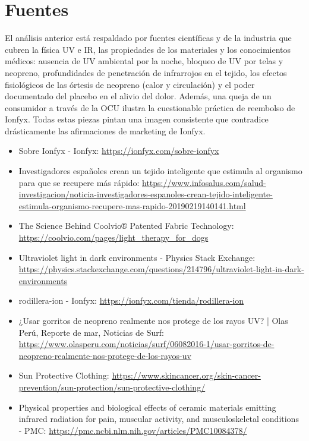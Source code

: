 \documentclass{article}
\begin{document}
\section*{Fuentes}
El análisis anterior está respaldado por fuentes científicas y de la industria que cubren la física UV e IR, las propiedades de los materiales y los conocimientos médicos: ausencia de UV ambiental por la noche, bloqueo de UV por telas y neopreno, profundidades de penetración de infrarrojos en el tejido, los efectos fisiológicos de las órtesis de neopreno (calor y circulación) y el poder documentado del placebo en el alivio del dolor. Además, una queja de un consumidor a través de la OCU ilustra la cuestionable práctica de reembolso de Ionfyx. Todas estas piezas pintan una imagen consistente que contradice drásticamente las afirmaciones de marketing de Ionfyx.
\begin{itemize}
    \item Sobre Ionfyx - Ionfyx: {\small\url{https://ionfyx.com/sobre-ionfyx}}
    \item Investigadores españoles crean un tejido inteligente que estimula al organismo para que se recupere más rápido: {\small\url{https://www.infosalus.com/salud-investigacion/noticia-investigadores-espanoles-crean-tejido-inteligente-estimula-organismo-recupere-mas-rapido-20190219140141.html}}
    \item The Science Behind Coolvio® Patented Fabric Technology: {\small\url{https://coolvio.com/pages/light_therapy_for_dogs}}
    \item Ultraviolet light in dark environments - Physics Stack Exchange: {\small\url{https://physics.stackexchange.com/questions/214796/ultraviolet-light-in-dark-environments}}
    \item rodillera-ion - Ionfyx: {\small\url{https://ionfyx.com/tienda/rodillera-ion}}
    \item ¿Usar gorritos de neopreno realmente nos protege de los rayos UV? | Olas Perú, Reporte de mar, Noticias de Surf: {\small\url{https://www.olasperu.com/noticias/surf/06082016-1/usar-gorritos-de-neopreno-realmente-nos-protege-de-los-rayos-uv}}
    \item Sun Protective Clothing: {\small\url{https://www.skincancer.org/skin-cancer-prevention/sun-protection/sun-protective-clothing/}}
    \item Physical properties and biological effects of ceramic materials emitting infrared radiation for pain, muscular activity, and musculoskeletal conditions - PMC: {\small\url{https://pmc.ncbi.nlm.nih.gov/articles/PMC10084378/}}

\end{itemize}
\end{document}
